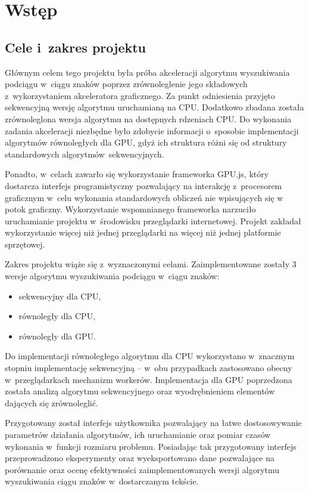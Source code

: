 
\section{Wstęp}

\subsection{Cele i~zakres projektu}
Głównym celem tego projektu była próba akceleracji algorytmu wyszukiwania podciągu w~ciągu znaków poprzez zrównoleglenie jego składowych z~wykorzystaniem akceleratora graficznego. Za punkt odniesienia przyjęto sekwencyjną wersję algorytmu uruchamianą na CPU. Dodatkowo zbadana została zrównoleglona wersja algorytmu na dostępnych rdzeniach CPU. Do wykonania zadania akceleracji niezbędne było zdobycie informacji o~sposobie implementacji algorytmów równoległych dla GPU, gdyż ich struktura różni się od struktury standardowych \mbox{algorytmów sekwencyjnych.}

Ponadto, w~celach zawarło się wykorzystanie frameworka GPU.js, który dostarcza interfejs programistyczny pozwalający na interakcję z~procesorem graficznym w~celu wykonania standardowych obliczeń nie wpisujących się w potok graficzny. Wykorzystanie wspomnianego frameworka narzuciło uruchamianie projektu w~środowisku przeglądarki internetowej. Projekt zakładał wykorzystanie więcej niż jednej przeglądarki na więcej niż jednej platformie sprzętowej.

Zakres projektu wiąże się z~wyznaczonymi celami. Zaimplementowane zostały 3 wersje algorytmu wyszukiwania podciągu w~ciągu znaków:
\begin{itemize}[noitemsep]
    \item sekwencyjny dla CPU,
    \item równoległy dla CPU,
    \item równoległy dla GPU.
\end{itemize}
Do implementacji równoległego algorytmu dla CPU wykorzystano w~znacznym stopniu implementację sekwencyjną -- w~obu przypadkach zastosowano obecny w~przeglądarkach mechanizm workerów. Implementacja dla GPU poprzedzona została analizą algorytmu sekwencyjnego oraz wyodrębnieniem elementów dających się zrównoleglić.

Przygotowany został interfejs użytkownika pozwalający na łatwe dostosowywanie parametrów działania algorytmów, ich uruchamianie oraz pomiar czasów wykonania w~funkcji rozmiaru problemu. Posiadając tak przygotowany interfejs przeprowadzono eksperymenty oraz wyeksportowano dane pozwalające na porównanie oraz ocenę efektywności zaimplementowanych wersji algorytmu wyszukiwania ciągu znaków w~dostarczanym tekście.


